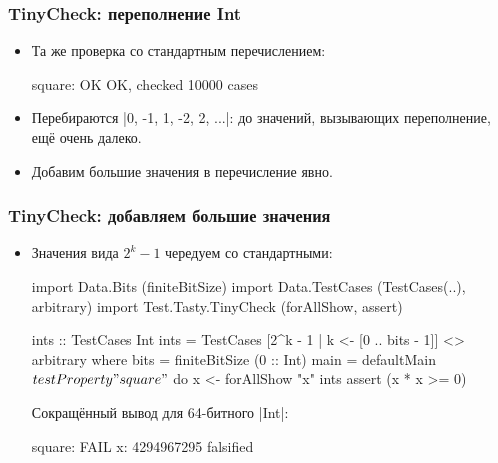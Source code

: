 \documentclass[11pt]{beamer}
\begin{document}
\begin{frame}[fragile]
  \frametitle{TinyCheck: переполнение Int}
  \begin{itemize}
    \item Та же проверка со стандартным перечислением:
          \pause
          \begin{ghcismall}
            square: OK
              OK, checked 10000 cases
          \end{ghcismall}
    \item Перебираются \haskinline|0, -1, 1, -2, 2, ...|: до значений, вызывающих переполнение, ещё очень далеко.
    \item Добавим большие значения в перечисление явно.
  \end{itemize}
\end{frame}

\begin{frame}[fragile]
  \frametitle{TinyCheck: добавляем большие значения}
  \begin{itemize}
    \item Значения вида $2^k-1$ чередуем со стандартными:
          \begin{haskellsmall}
            import Data.Bits (finiteBitSize)
            import Data.TestCases (TestCases(..), arbitrary)
            import Test.Tasty.TinyCheck (forAllShow, assert)

            ints :: TestCases Int
            ints = TestCases [2^k - 1 | k <- [0 .. bits - 1]]
              <> arbitrary
              where bits = finiteBitSize (0 :: Int)
            main = defaultMain $ testProperty "square" $ do
              x <- forAllShow "x" ints
              assert (x * x >= 0)
          \end{haskellsmall}
          \pause
          {\footnotesize Сокращённый вывод для 64-битного \haskinline|Int|:}
          \begin{ghcismall}
            square: FAIL
              x: 4294967295
              falsified
          \end{ghcismall}
  \end{itemize}
\end{frame}
\end{document}
